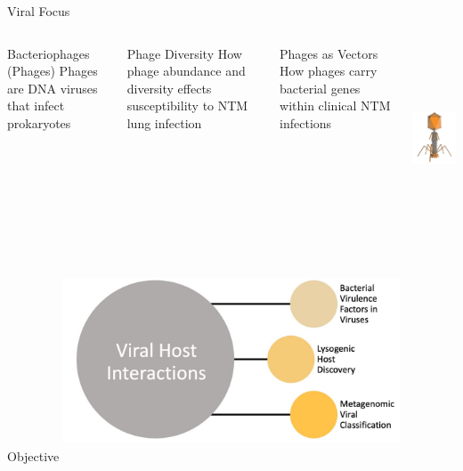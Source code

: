 \documentclass[11pt, xcolor=table]{beamer}
\begin{document}
	\begin{frame}{Viral Focus}
	\begin{columns}
	\begin{block}{Bacteriophages (Phages)}
	Phages are DNA viruses that infect prokaryotes
	\end{block}
	
	\begin{block}{Phage Diversity}
	How phage abundance and diversity effects susceptibility to NTM lung infection
	\end{block}
	
	\begin{block}{Phages as Vectors}
	How phages carry bacterial genes within clinical NTM infections
	\end{block}
	
	
	\includegraphics[height=5.5cm, width=5cm]{phage.png} \\
	\end{columns}
	
	
	\end{frame}

	\begin{frame}{Objective}
	\center
	\includegraphics[height=6cm, width=10cm]{CPBS_11_18/Overview.jpg}
	
	\end{frame}
\end{document}
